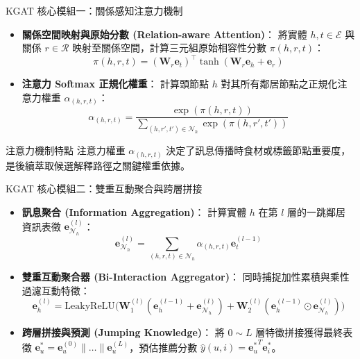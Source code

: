 \documentclass[aspectratio=169, 10pt]{beamer}
\begin{document}
\begin{frame}{KGAT 核心模組一：關係感知注意力機制}
  \begin{itemize}
    \item \alert{\textbf{關係空間映射與原始分數 (Relation-aware Attention)}}：
      將實體 $h, t \in \mathcal{E}$ 與關係 $r \in \mathcal{R}$ 映射至關係空間，計算三元組原始相容性分數 $\pi(h, r, t)$：
      \[
        \pi(h, r, t) = (\mathbf{W}_r \mathbf{e}_t)^\top \tanh(\mathbf{W}_r \mathbf{e}_h + \mathbf{e}_r)
      \]
    \item \alert{\textbf{注意力 Softmax 正規化權重}}：
      計算頭節點 $h$ 對其所有鄰居節點之正規化注意力權重 $\alpha_{(h, r, t)}$：
      \[
        \alpha_{(h, r, t)} = \frac{\exp(\pi(h, r, t))}{\sum_{(h, r', t') \in \mathcal{N}_h} \exp(\pi(h, r', t'))}
      \]
  \end{itemize}

  \vspace{0.2cm}
  \begin{examplebox}{注意力機制特點}
    注意力權重 $\alpha_{(h, r, t)}$ 決定了訊息傳播時食材或標籤節點重要度，是後續萃取候選解釋路徑之關鍵權重依據。
  \end{examplebox}
\end{frame}

\begin{frame}{KGAT 核心模組二：雙重互動聚合與跨層拼接}
  \begin{itemize}
    \item \alert{\textbf{訊息聚合 (Information Aggregation)}}：
      計算實體 $h$ 在第 $l$ 層的一跳鄰居資訊表徵 $\mathbf{e}_{\mathcal{N}_h}^{(l)}$：
      \[
        \mathbf{e}_{\mathcal{N}_h}^{(l)} = \sum_{(h, r, t) \in \mathcal{N}_h} \alpha_{(h, r, t)} \mathbf{e}_t^{(l-1)}
      \]
    \item \alert{\textbf{雙重互動聚合器 (Bi-Interaction Aggregator)}}：
      同時捕捉加性累積與乘性過濾互動特徵：
      \[
        \mathbf{e}_h^{(l)} = \text{LeakyReLU}\Big( \mathbf{W}_1^{(l)} (\mathbf{e}_h^{(l-1)} + \mathbf{e}_{\mathcal{N}_h}^{(l)}) + \mathbf{W}_2^{(l)} (\mathbf{e}_h^{(l-1)} \odot \mathbf{e}_{\mathcal{N}_h}^{(l)}) \Big)
      \]
    \item \alert{\textbf{跨層拼接與預測 (Jumping Knowledge)}}：
      將 $0 \sim L$ 層特徵拼接獲得最終表徵 $\mathbf{e}_u^* = \mathbf{e}_u^{(0)} \| \dots \| \mathbf{e}_u^{(L)}$，預估推薦分數 $\hat{y}(u, i) = {\mathbf{e}_u^*}^T \mathbf{e}_i^*$。
  \end{itemize}
\end{frame}
\end{document}
